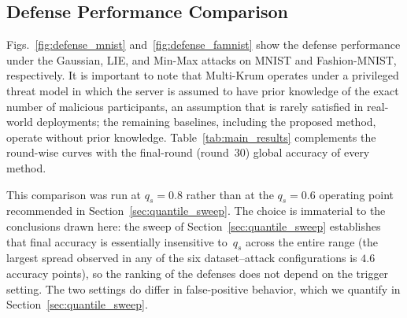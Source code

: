 \documentclass[journal]{IEEEtran}
\begin{document}
\subsection{Defense Performance Comparison}
\label{sec:defense_comparison}

Figs.~\ref{fig:defense_mnist} and~\ref{fig:defense_famnist} show the defense performance under the Gaussian, LIE, and Min-Max attacks on MNIST and Fashion-MNIST, respectively. It is important to note that Multi-Krum operates under a privileged threat model in which the server is assumed to have prior knowledge of the exact number of malicious participants, an assumption that is rarely satisfied in real-world deployments; the remaining baselines, including the proposed method, operate without prior knowledge. Table~\ref{tab:main_results} complements the round-wise curves with the final-round (round~$30$) global accuracy of every method.

This comparison was run at $q_s = 0.8$ rather than at the $q_s = 0.6$ operating point recommended in Section~\ref{sec:quantile_sweep}. The choice is immaterial to the conclusions drawn here: the sweep of Section~\ref{sec:quantile_sweep} establishes that final accuracy is essentially insensitive to~$q_s$ across the entire range (the largest spread observed in any of the six dataset--attack configurations is $4.6$ accuracy points), so the ranking of the defenses does not depend on the trigger setting. The two settings do differ in false-positive behavior, which we quantify in Section~\ref{sec:quantile_sweep}.
\end{document}
